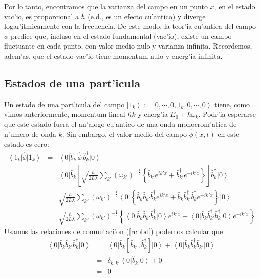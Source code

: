 Por lo tanto, encontramos que la varianza del campo en un punto $x$, en el
estado vac'io, es proporcional a $\hbar$ (e.d., es un efecto cu'antico) y
diverge
logar'itmicamente con la frecuencia. De este modo, la teor'ia cu'antica del
campo
$\phi$ predice que, incluso en el estado fundamental (vac'io), existe un campo
fluctuante en cada punto, con valor medio nulo y varianza infinita. Recordemos,
adem'as, que el estado vac'io tiene momentum nulo y energ'ia infinita.

\subsection{Estados de una part'icula}
Un estado de una part'icula del campo $\left|
1_k\right>:=\left|0,\cdots,0,1_k,0,\cdots,0\right>$ tiene, como vimos
anteriormente, momentum lineal $\hbar k$ y energ'ia $E_0+\hbar\omega_k$. Podr'ia
esperarse que este estado fuera el an'alogo cu'antico de una onda monocrom'atica
de
n'umero de onda $k$. Sin embargo, el valor medio del campo $\hat{\phi}(x,t) $ en
este estado es cero:
\begin{eqnarray}
\left< 1_k\right| \hat{\phi}\left| 1_k\right> & = &\left<
0\right| \hat{b}_k\,\hat{\phi}\,\hat{b}_k^\dagger \left| 0\right>
\\
& = &\left< 0\right| \hat{b}_k\left[ \sqrt{\frac{\hbar}{2L\lambda}}\sum_{k'}\left( \omega_{k'}\right) ^{-\frac{1}{2}}\left\{ \hat{b}_{k'}
e^{ik'x}+\hat{b}_{k'}^\dagger e^{-ik'x}\right\} \right] \hat{b}_k^{\dagger
}\left| 0\right> \\
& = &\sqrt{\frac{\hbar}{2L\lambda}}\sum_{k'}\left( \omega_{k'}\right) ^{-\frac
{1}{2}}\left< 0\right|
\left\{\hat{b}_k\hat{b}_{k'}\hat{b}_k^\dagger e^{ik'x}
+\hat{b}_k\hat{b}_{k'}^{ \dagger}\hat{b}_k^\dagger e^{-ik'x}\right\}
\left|0\right> \\
& = &\sqrt{\frac{\hbar}{2L\lambda}}\sum_{k'}\left( \omega_{k'}\right) ^{-\frac
{1}{2}}\left\{ \left< 0\right|
\hat{b}_k\hat{b}_{k'}\hat{b}_k^\dagger \left| 0\right> e^{ik'x}
+\left<0\right|\hat{b}_k\hat{b}_{k'}^\dagger \hat{b}_k^\dagger \left|
0\right>e^{-ik'x}\right\}
\end{eqnarray}
Usamos las relaciones de conmutaci'on (\ref{rcbbd}) podemos calcular que
\begin{eqnarray}
 \left<0\right|\hat{b}_k\hat{b}_{k'}\hat{b}_k^\dagger
\left|0\right>&=&\left<0\right|\hat{b}_k\left[\hat{b}_{k'},\hat{b}
^\dagger_k\right]\left|0\right>+\left<0\right|\hat{b}_k\hat{b}^\dagger_k\hat{b}
_{k'}\left|0\right> \\
&=&\delta_{k,k'}\left<0\right|\hat{b}_k\left|0\right>+0 \\
&=&0
\end{eqnarray}
